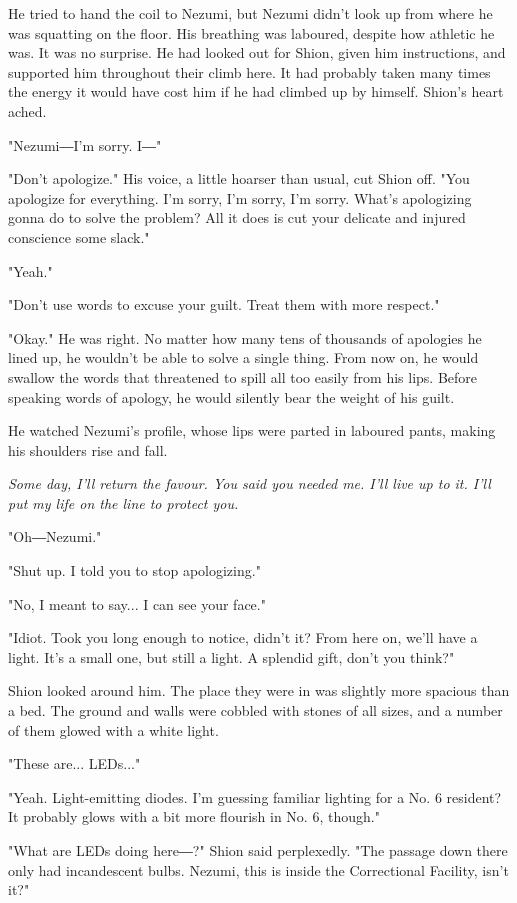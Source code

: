 He tried to hand the coil to Nezumi, but Nezumi didn't look up from
where he was squatting on the floor. His breathing was laboured, despite
how athletic he was. It was no surprise. He had looked out for Shion,
given him instructions, and supported him throughout their climb here.
It had probably taken many times the energy it would have cost him if he
had climbed up by himself. Shion's heart ached.

"Nezumi―I'm sorry. I―"

"Don't apologize." His voice, a little hoarser than usual, cut Shion
off. "You apologize for everything. I'm sorry, I'm sorry, I'm sorry.
What's apologizing gonna do to solve the problem? All it does is cut
your delicate and injured conscience some slack."

"Yeah."

"Don't use words to excuse your guilt. Treat them with more respect."

"Okay." He was right. No matter how many tens of thousands of apologies
he lined up, he wouldn't be able to solve a single thing. From now on,
he would swallow the words that threatened to spill all too easily from
his lips. Before speaking words of apology, he would silently bear the
weight of his guilt.

He watched Nezumi's profile, whose lips were parted in laboured pants,
making his shoulders rise and fall.

\emph{Some day, I'll return the favour. You said you needed me. I'll live up
to it. I'll put my life on the line to protect you.}

"Oh―Nezumi."

"Shut up. I told you to stop apologizing."

"No, I meant to say... I can see your face."

"Idiot. Took you long enough to notice, didn't it? From here on, we'll
have a light. It's a small one, but still a light. A splendid gift,
don't you think?"

Shion looked around him. The place they were in was slightly more
spacious than a bed. The ground and walls were cobbled with stones of
all sizes, and a number of them glowed with a white light.

"These are... LEDs..."

"Yeah. Light-emitting diodes. I'm guessing familiar lighting for a No. 6
resident? It probably glows with a bit more flourish in No. 6, though."

"What are LEDs doing here―?" Shion said perplexedly. "The passage down
there only had incandescent bulbs. Nezumi, this is inside the
Correctional Facility, isn't it?"

